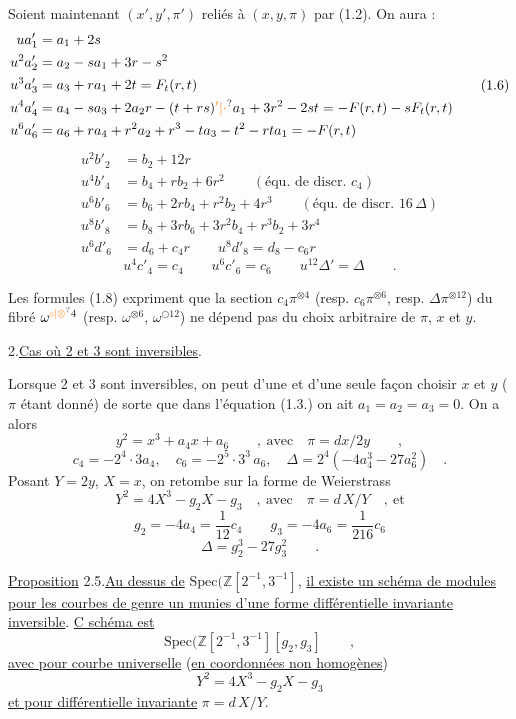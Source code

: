 Soient maintenant $(x',y',\pi')$ reliés à $(x,y,\pi)$ par (1.2). On aura :
\[
\begin{aligned}
ua'_1&=a_1+2s\\
u^2a'_2&=a_2-sa_1+3r-s^2\\
u^3a'_3&=a_3+ra_1+2t=F_t(r,t)\\
u^4a'_4&=a_4-sa_3+2a_2r-(t+rs)\unsure{{}'|\cdot}a_1+3r^2-2st=-F(r,t)-sF_t(r,t)\\
u^6a'_6&=a_6+ra_4+r^2a_2+r^3-ta_3-t^2-rta_1=-F(r,t)
\end{aligned}\tag*{(1.6)}
\]
\[
\begin{aligned}
u^2b'_2&=b_2+12r\\
u^4b'_4&=b_4+rb_2+6r^2\qquad(\text{équ. de discr. }c_4)\\
u^6b'_6&=b_6+2rb_4+r^2b_2+4r^3\qquad(\text{équ. de discr. }16\,\Delta)\\
u^8b'_8&=b_8+3rb_6+3r^2b_4+r^3b_2+3r^4\\
u^6d'_6&=d_6+c_4r\qquad u^8d'_8=d_8-c_6r
\end{aligned}\tag*{(1.7)}
\]
\[
u^4c'_4=c_4\qquad u^6c'_6=c_6\qquad u^{12}\Delta'=\Delta\qquad .\tag*{(1.8)}
\]

Les formules (1.8) expriment que la section $c_4\pi^{\otimes4}$ (resp. $c_6\pi^{\otimes6}$, resp. $\Delta\pi^{\otimes12}$) du fibré $\omega^{\unsure{\tikz[baseline=.06ex,x=1ex,y=1ex]{\draw[line width=.055ex] (.4,.4) circle (.33); \draw[line width=.055ex] (.17,.63)--(.63,.17);}|\otimes}4}$ (resp. $\omega^{\otimes6}$, $\omega^{\bigcirc12}$) ne dépend pas du choix arbitraire de $\pi$, $x$ et $y$.

2.\qquad \uline{Cas où 2 et 3 sont inversibles}.

Lorsque 2 et 3 sont inversibles, on peut d'une et d'une seule façon choisir $x$ et $y$ ($\pi$ étant donné) de sorte que dans l'équation (1.3.) on ait $a_1=a_2=a_3=0$. On a alors
\[
y^2=x^3+a_4x+a_6\qquad,\ \text{avec}\quad\pi=dx/2y\qquad,\tag*{(2.1)}
\]
\[
c_4=-2^4\cdot3a_4,\quad c_6=-2^5\cdot3^3\,a_6,\quad\Delta=2^4(-4a_4^3-27a_6^2)\quad .\tag*{(2.2)}
\]
Posant $Y=2y$, $X=x$, on retombe sur la forme de Weierstrass
\[
Y^2=4X^3-g_2X-g_3\quad,\ \text{avec}\quad\pi=d\,X/Y\quad,\ \text{et}\tag*{(2.3)}
\]
\[
g_2=-4a_4=\frac{1}{12}c_4\qquad g_3=-4a_6=\frac{1}{216}c_6\tag*{(2.4)}
\]
\[
\Delta=g_2^3-27g_3^2\qquad .
\]

\uline{Proposition} 2.5.\qquad \uline{Au dessus de} $\mathrm{Spec}(\mathbb Z[2^{-1},3^{-1}]$, \uline{il existe un schéma de modules pour les courbes de genre un munies d'une forme différentielle invariante inversible}. \uline{C schéma est}
\[
\mathrm{Spec}(\mathbb Z[2^{-1},3^{-1}][g_2,g_3]\qquad ,
\]
\uline{avec pour courbe universelle} (\uline{en coordonnées non homogènes}) 
\[
Y^2=4X^3-g_2X-g_3
\]
\uline{et pour différentielle invariante} $\pi=d\,X/Y$.

